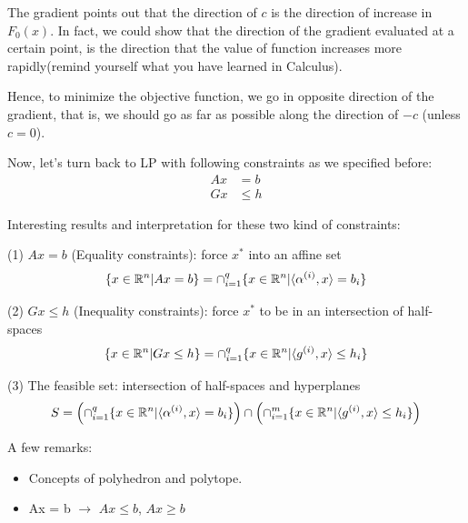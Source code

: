 The gradient points out that the direction of $c$ is the direction of increase in $F_0(x)$. In fact, we could show that the direction of the gradient evaluated at a certain point, is the direction that the value of function increases more rapidly(remind yourself what you have learned in Calculus).

Hence, to minimize the objective function, we go in opposite direction of the gradient, that is, we should go as far as possible along the direction of $-c$ (unless $c=0$).


\vspace{0.5cm}
Now, let's turn back to LP with following constraints as we specified before:
\begin{align*}
	Ax &= b\\
	Gx &\leq h
\end{align*}

Interesting results and interpretation for these two kind of constraints:

(1) $Ax=b$ (Equality constraints): force $x^*$ into an affine set
$$\{x\in \mathbb{R}^n|Ax = b \} =  \cap^q_{i=1}\{x\in \mathbb{R}^n|\langle\alpha^{(i)}, x\rangle = b_i \}$$

(2) $Gx\leq h$ (Inequality constraints): force $x^*$ to be in an intersection of half-spaces
$$\{x\in \mathbb{R}^n|Gx \leq h \} =  \cap^q_{i=1}\{x\in \mathbb{R}^n| \langle g^{(i)}, x\rangle \leq h_i \}$$

(3) The feasible set: intersection of half-spaces and hyperplanes
$$
S = \left(\cap^q_{i=1}\{x\in \mathbb{R}^n | \langle \alpha^{(i)}, x\rangle = b_i \}\right) \cap \left(\cap^m_{i=1}\{x\in \mathbb{R}^n | \langle g^{(i)}, x\rangle \leq h_i \}\right)
$$


A few remarks:
\begin{itemize}
	\item Concepts of polyhedron and polytope.
	
	\item Ax = b $\rightarrow$ $Ax \leq b$, $Ax \geq b$
\end{itemize}



